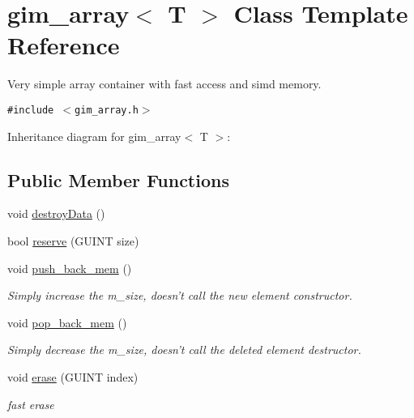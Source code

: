 \hypertarget{classgim__array}{
\section{gim\_\-array$<$ T $>$ Class Template Reference}
\label{classgim__array}
}
Very simple array container with fast access and simd memory.  


{\tt \#include $<$gim\_\-array.h$>$}

Inheritance diagram for gim\_\-array$<$ T $>$:\subsection*{Public Member Functions}
\begin{Indent}{\bf }\par
\begin{CompactItemize}
\item 
void \hyperlink{classgim__array_a7a9dca42674415635846cd077cb4a97}{destroyData} ()
\end{CompactItemize}
\end{Indent}
\begin{Indent}{\bf }\par
\begin{CompactItemize}
\item 
bool \hyperlink{classgim__array_572f94b5b67d505335150a2dea8a7e3d}{reserve} (GUINT size)
\item 
\hypertarget{classgim__array_cbd3ad9a6756d0b91e42549a0e7107f0}{
void \hyperlink{classgim__array_cbd3ad9a6756d0b91e42549a0e7107f0}{push\_\-back\_\-mem} ()}
\label{classgim__array_cbd3ad9a6756d0b91e42549a0e7107f0}

\begin{CompactList}\small\item\em Simply increase the m\_\-size, doesn't call the new element constructor. \item\end{CompactList}\item 
\hypertarget{classgim__array_a15906909f6f824e559864359096db63}{
void \hyperlink{classgim__array_a15906909f6f824e559864359096db63}{pop\_\-back\_\-mem} ()}
\label{classgim__array_a15906909f6f824e559864359096db63}

\begin{CompactList}\small\item\em Simply decrease the m\_\-size, doesn't call the deleted element destructor. \item\end{CompactList}\item 
\hypertarget{classgim__array_0de98d5b161c18568c7bc3a13e90df51}{
void \hyperlink{classgim__array_0de98d5b161c18568c7bc3a13e90df51}{erase} (GUINT index)}
\label{classgim__array_0de98d5b161c18568c7bc3a13e90df51}

\begin{CompactList}\small\item\em fast erase \item\end{CompactList}\end{CompactItemize}
\end{Indent}
